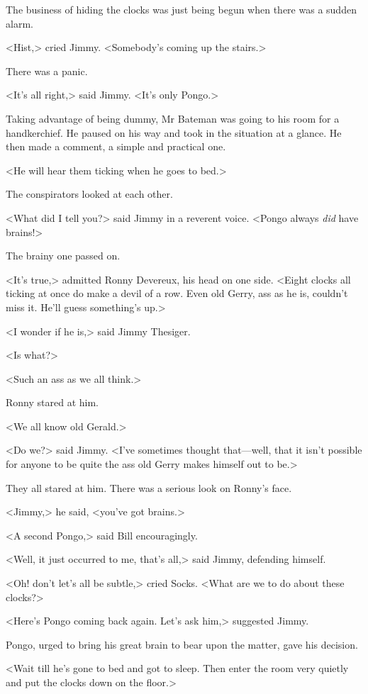 The business of hiding the clocks was just being begun when there was a sudden alarm.

<Hist,> cried Jimmy. <Somebody's coming up the stairs.>

There was a panic.

<It's all right,> said Jimmy. <It's only Pongo.>

Taking advantage of being dummy, Mr Bateman was going to his room for a handkerchief. He paused on his way and took in the situation at a glance. He then made a comment, a simple and practical one.

<He will hear them ticking when he goes to bed.>

The conspirators looked at each other.

<What did I tell you?> said Jimmy in a reverent voice. <Pongo always \emph{did} have brains!>

The brainy one passed on.

<It's true,> admitted Ronny Devereux, his head on one side. <Eight clocks all ticking at once do make a devil of a row. Even old Gerry, ass as he is, couldn't miss it. He'll guess something's up.>

<I wonder if he is,> said Jimmy Thesiger.

<Is what?>

<Such an ass as we all think.>

Ronny stared at him.

<We all know old Gerald.>

<Do we?> said Jimmy. <I've sometimes thought that—well, that it isn't possible for anyone to be quite the ass old Gerry makes himself out to be.>

They all stared at him. There was a serious look on Ronny's face.

<Jimmy,> he said, <you've got brains.>

<A second Pongo,> said Bill encouragingly.

<Well, it just occurred to me, that's all,> said Jimmy, defending himself.

<Oh! don't let's all be subtle,> cried Socks. <What are we to do about these clocks?>

<Here's Pongo coming back again. Let's ask him,> suggested Jimmy.

Pongo, urged to bring his great brain to bear upon the matter, gave his decision.

<Wait till he's gone to bed and got to sleep. Then enter the room very quietly and put the clocks down on the floor.>

